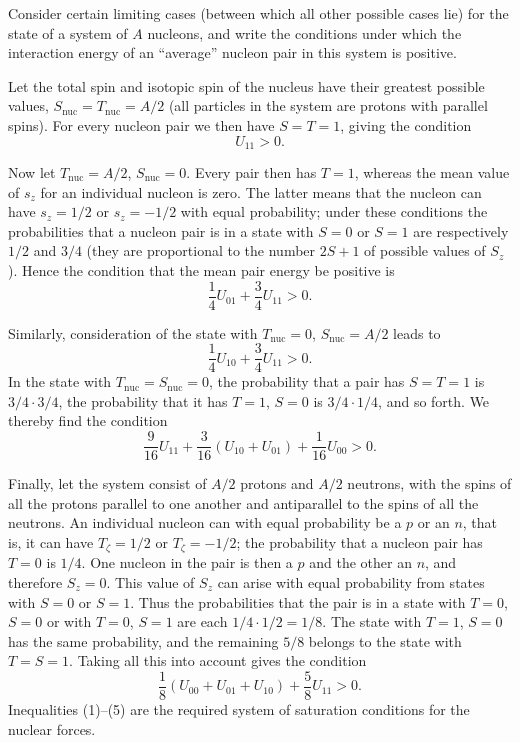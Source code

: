 \SolutionHeading Consider certain limiting cases (between which all other
possible cases lie) for the state of a system of $A$ nucleons, and write the
conditions under which the interaction energy of an ``average'' nucleon pair
in this system is positive.

Let the total spin and isotopic spin of the nucleus have their greatest
possible values, $S_{\text{nuc}}=T_{\text{nuc}}=A/2$ (all particles in the
system are protons with parallel spins). For every nucleon pair we then have
$S=T=1$, giving the condition
\begin{equation}
 U_{11}>0.
 \tag{1}
\end{equation}

Now let $T_{\text{nuc}}=A/2$, $S_{\text{nuc}}=0$. Every pair then has $T=1$,
whereas the mean value of $s_z$ for an individual nucleon is zero. The latter
means that the nucleon can have $s_z=1/2$ or $s_z=-1/2$ with equal
probability; under these conditions the probabilities that a nucleon pair is
in a state with $S=0$ or $S=1$ are respectively $1/2$ and $3/4$ (they are
proportional to the number $2S+1$ of possible values of $S_z$). Hence the
condition that the mean pair energy be positive is
\begin{equation}
 \frac14U_{01}+\frac34U_{11}>0.
 \tag{2}
\end{equation}

Similarly, consideration of the state with $T_{\text{nuc}}=0$,
$S_{\text{nuc}}=A/2$ leads to
\begin{equation}
 \frac14U_{10}+\frac34U_{11}>0.
 \tag{3}
\end{equation}
In the state with $T_{\text{nuc}}=S_{\text{nuc}}=0$, the probability that a
pair has $S=T=1$ is $3/4\cdot3/4$, the probability that it has $T=1$, $S=0$
is $3/4\cdot1/4$, and so forth. We thereby find the condition
\begin{equation}
 \frac9{16}U_{11}+\frac3{16}(U_{10}+U_{01})+\frac1{16}U_{00}>0.
 \tag{4}
\end{equation}

Finally, let the system consist of $A/2$ protons and $A/2$ neutrons, with the
spins of all the protons parallel to one another and antiparallel to the spins
of all the neutrons. An individual nucleon can with equal probability be a
$p$ or an $n$, that is, it can have $T_\zeta=1/2$ or $T_\zeta=-1/2$; the
probability that a nucleon pair has $T=0$ is $1/4$. One nucleon in the pair is
then a $p$ and the other an $n$, and therefore $S_z=0$. This value of $S_z$
can arise with equal probability from states with $S=0$ or $S=1$. Thus the
probabilities that the pair is in a state with $T=0$, $S=0$ or with $T=0$,
$S=1$ are each $1/4\cdot1/2=1/8$. The state with $T=1$, $S=0$ has the same
probability, and the remaining $5/8$ belongs to the state with $T=S=1$.
Taking all this into account gives the condition
\begin{equation}
 \frac18(U_{00}+U_{01}+U_{10})+\frac58U_{11}>0.
 \tag{5}
\end{equation}
Inequalities (1)--(5) are the required system of saturation conditions for
the nuclear forces.
